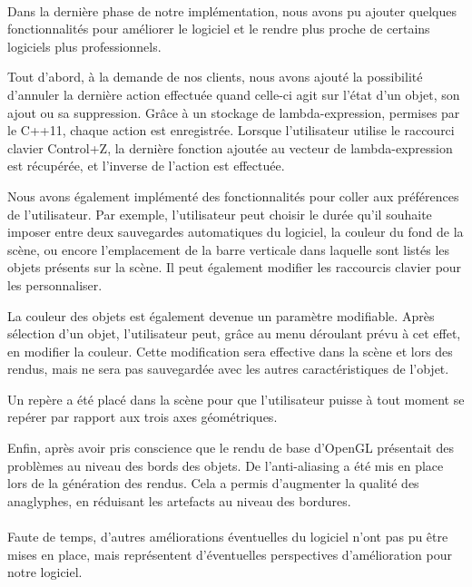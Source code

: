 \paragraph{}
Dans la dernière phase de notre implémentation, nous avons pu ajouter quelques fonctionnalités pour améliorer le logiciel et le rendre plus proche de certains logiciels plus professionnels.

Tout d'abord, à la demande de nos clients, nous avons ajouté la possibilité d'annuler la dernière action effectuée quand celle-ci agit sur l'état d'un objet, son ajout ou sa suppression. Grâce à un stockage de lambda-expression, permises par le C++11, chaque action est enregistrée. Lorsque l'utilisateur utilise le raccourci clavier Control+Z, la dernière fonction ajoutée au vecteur de lambda-expression est récupérée, et l'inverse de l'action est effectuée.

Nous avons également implémenté des fonctionnalités pour coller aux préférences de l'utilisateur. Par exemple, l'utilisateur peut choisir le durée qu'il souhaite imposer entre deux sauvegardes automatiques du logiciel, la couleur du fond de la scène, ou encore l'emplacement de la barre verticale dans laquelle sont listés les objets présents sur la scène. Il peut également modifier les raccourcis clavier pour les personnaliser.

La couleur des objets est également devenue un paramètre modifiable. Après sélection d'un objet, l'utilisateur peut, grâce au menu déroulant prévu à cet effet, en modifier la couleur. Cette modification sera effective dans la scène et lors des rendus, mais ne sera pas sauvegardée avec les autres caractéristiques de l'objet.

Un repère a été placé dans la scène pour que l'utilisateur puisse à tout moment se repérer par rapport aux trois axes géométriques.

Enfin, après avoir pris conscience que le rendu de base d'OpenGL présentait des problèmes au niveau des bords des objets. De l'anti-aliasing a été mis en place lors de la génération des rendus. Cela a permis d'augmenter la qualité des anaglyphes, en réduisant les artefacts au niveau des bordures.


\paragraph{}
Faute de temps, d'autres améliorations éventuelles du logiciel n'ont pas pu être mises en place, mais représentent d'éventuelles perspectives d'amélioration pour notre logiciel.

